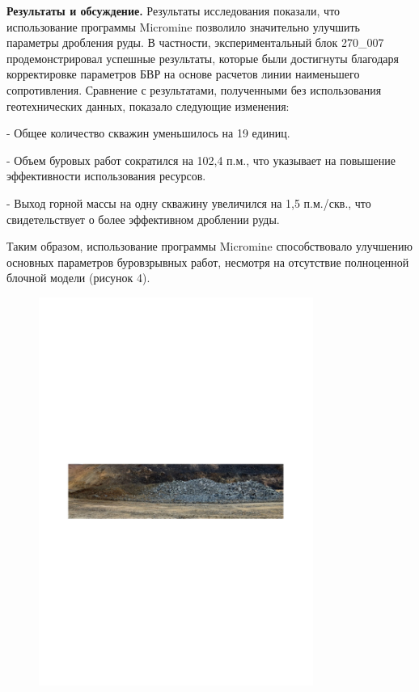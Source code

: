 {\bfseries Результаты и обсуждение.} Результаты исследования показали, что
использование программы Micromine позволило значительно улучшить
параметры дробления руды. В частности, экспериментальный блок 270\_007
продемонстрировал успешные результаты, которые были достигнуты благодаря
корректировке параметров БВР на основе расчетов линии наименьшего
сопротивления. Сравнение с результатами, полученными без использования
геотехнических данных, показало следующие изменения:

- Общее количество скважин уменьшилось на 19 единиц.

- Объем буровых работ сократился на 102,4 п.м., что указывает на
повышение эффективности использования ресурсов.

- Выход горной массы на одну скважину увеличился на 1,5 п.м./скв., что
свидетельствует о более эффективном дроблении руды.

Таким образом, использование программы Micromine способствовало
улучшению основных параметров буровзрывных работ, несмотря на отсутствие
полноценной блочной модели (рисунок 4).

\begin{figure}[H]
	\centering
	\includegraphics[width=0.8\textwidth]{media/gor/image31}
	\caption*{}
\end{figure}


